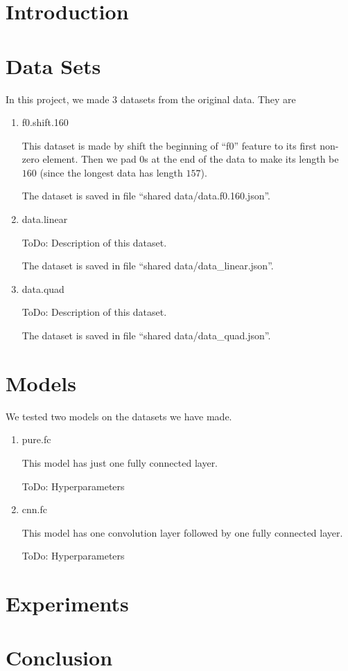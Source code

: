\documentclass[a4paper]{article}
\begin{document}
\maketitle
\pagebreak

\section{Introduction}
\section{Data Sets}

In this project, we made $3$ datasets from the original data. They are
\begin{enumerate}
\item f0.shift.160

	This dataset is made by shift the beginning of ``f0'' feature to its first non-zero element. Then we pad $0$s at the end of the data to make its length be $160$ (since the longest data has length $157$).

	The dataset is saved in file ``shared data/data.f0.160.json''.
\item data.linear

	ToDo: Description of this dataset.

	The dataset is saved in file ``shared data/data\_linear.json''.

\item data.quad
	
	ToDo: Description of this dataset.

	The dataset is saved in file ``shared data/data\_quad.json''.

\end{enumerate}

\section{Models}

We tested two models on the datasets we have made.
\begin{enumerate}
\item pure.fc

	This model has just one fully connected layer.

	ToDo: Hyperparameters

\item cnn.fc

	This model has one convolution layer followed by one fully connected layer.

	ToDo: Hyperparameters
\end{enumerate}

\section{Experiments}

\section{Conclusion}
\end{document}
